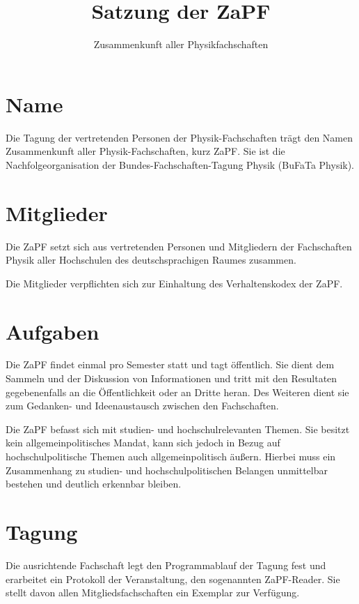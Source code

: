 \documentclass[
  a4paper,
  oneside]{scrartcl}
\title{Satzung der ZaPF}
\author{Zusammenkunft aller Physikfachschaften}
\date{}
\begin{document}
\maketitle

\hypertarget{name}{%
\section{Name}\label{name}}

Die Tagung der vertretenden Personen der Physik-Fachschaften trägt den
Namen Zusammenkunft aller Physik-Fachschaften, kurz ZaPF. Sie ist die
Nachfolgeorganisation der Bundes-Fachschaften-Tagung Physik (BuFaTa
Physik).

\hypertarget{mitglieder}{%
\section{Mitglieder}\label{mitglieder}}

Die ZaPF setzt sich aus vertretenden Personen und Mitgliedern der
Fachschaften Physik aller Hochschulen des deutschsprachigen Raumes
zusammen.

Die Mitglieder verpflichten sich zur Einhaltung des Verhaltenskodex der
ZaPF.

\hypertarget{aufgaben}{%
\section{Aufgaben}\label{aufgaben}}

Die ZaPF findet einmal pro Semester statt und tagt öffentlich. Sie dient
dem Sammeln und der Diskussion von Informationen und tritt mit den
Resultaten gegebenenfalls an die Öffentlichkeit oder an Dritte heran.
Des Weiteren dient sie zum Gedanken- und Ideenaustausch zwischen den
Fachschaften.

Die ZaPF befasst sich mit studien- und hochschulrelevanten Themen. Sie
besitzt kein allgemeinpolitisches Mandat, kann sich jedoch in Bezug auf
hochschulpolitische Themen auch allgemeinpolitisch äußern. Hierbei muss
ein Zusammenhang zu studien- und hochschulpolitischen Belangen
unmittelbar bestehen und deutlich erkennbar bleiben.

\hypertarget{tagung}{%
\section{Tagung}\label{tagung}}

Die ausrichtende Fachschaft legt den Programmablauf der Tagung fest und
erarbeitet ein Protokoll der Veranstaltung, den sogenannten ZaPF-Reader.
Sie stellt davon allen Mitgliedsfachschaften ein Exemplar zur Verfügung.
\end{document}
